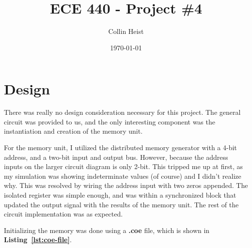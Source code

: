 \documentclass[a4paper, 12pt]{article}
\let\counterwithin\relax
\begin{document}
\counterwithin{lstlisting}{section} %
\title{ECE 440 - Project \#4}
\author{Collin Heist}
\date{\today}
\maketitle

\tableofcontents
\renewcommand{\listfigurename}{Figures}
\listoffigures
\lstlistoflistings
\newpage
{}

\section{Design}
There was really no design consideration necessary for this project. The general circuit was provided to us, and the only interesting component was the instantiation and creation of the memory unit.

For the memory unit, I utilized the distributed memory generator with a 4-bit address, and a two-bit input and output bus. However, because the address inputs on the larger circuit diagram is only 2-bit. This tripped me up at first, as my simulation was showing indeterminate values (of course) and I didn't realize why. This was resolved by wiring the address input with two zeros appended. The isolated register was simple enough, and was within a synchronized block that updated the output signal with the results of the memory unit. The rest of the circuit implementation was as expected.

Initializing the memory was done using a \textbf{.coe} file, which is shown in \textbf{Listing~\ref{lst:coe-file}}.
\end{document}
